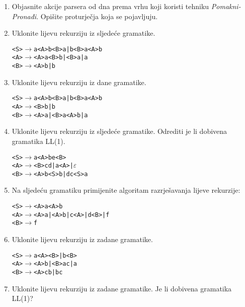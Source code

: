 \documentclass[times, 12pt, utf8]{book}
\begin{document}
\begin{enumerate}[resume]
\item
Objasnite akcije parsera od dna prema vrhu koji koristi tehniku \emph{Pomakni-Pronađi}. Opišite proturječja koja se pojavljuju. \cite[str.~123-125]{udzbenik}

\item 
Uklonite lijevu rekurziju iz sljedeće gramatike. \cite[str.~110-111]{udzbenik}

\begin{alltt}
<S> \(\to\) a<A>b<B>a | b<B>a<A>b
<A> \(\to\) <A>a<B>b | <B>a | a
<B> \(\to\) <A>b | b
\end{alltt} 

\item
Uklonite lijevu rekurziju iz dane gramatike. \cite[str.~110-111]{udzbenik}

\begin{alltt}
<S> \(\to\) a<A>b<B>a | b<B>a<A>b
<A> \(\to\) <B>b | b
<B> \(\to\) <A>a | <B>a<A>b | a
\end{alltt} 


\item
Uklonite lijevu rekurziju iz sljedeće gramatike. Odrediti je li dobivena gramatika LL(1). \cite[str.~110-111]{udzbenik}

\begin{alltt} 
<S> \(\to\) a<A>be<B>
<A> \(\to\) <B>cd | a<A> | \(\varepsilon\)
<B> \(\to\) <A>b<S>b | dc<S>a
\end{alltt} 

\item
Na sljedeću gramatiku primijenite algoritam razrješavanja lijeve rekurzije: \cite[str.~110-111]{udzbenik}

\begin{alltt}
<S> \(\to\) <A>a<A>b
<A> \(\to\) <A>a | <A>b | c<A> | d<B> | f
<B> \(\to\) f
\end{alltt} 


\item
Uklonite lijevu rekurziju iz zadane gramatike. \cite[str.~110-111]{udzbenik}

\begin{alltt}
<S> \(\to\) a<A><B> | b<B>
<A> \(\to\) <A>b | <B>ac | a
<B> \(\to\) <A>cb | bc
\end{alltt} 

\item
Uklonite lijevu rekurziju iz zadane gramatike. Je li dobivena gramatika LL(1)? \cite[str.~110-111]{udzbenik}


\end{enumerate}
\end{document}
